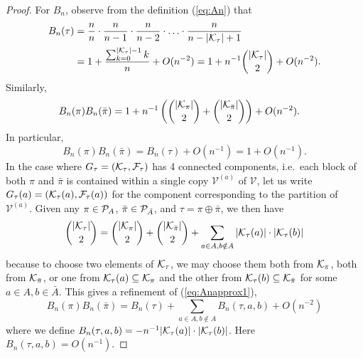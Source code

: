 \documentclass[10pt,reqno]{amsart}
\def\cV{\mathcal{V}}
\begin{document}
\begin{proof}
For $B_n$, observe from the definition (\ref{eq:An}) that
\begin{align*}
B_n(\tau)&=\frac{n}{n} \cdot \frac{n}{n-1} \cdot \frac{n}{n-2}
\cdot \ldots \cdot \frac{n}{n-|\mathcal{K}_\tau|+1}\\
&=1+\frac{\sum_{k=0}^{|\mathcal{K}_\tau|-1} k}{n}+O(n^{-2})
=1+n^{-1}\binom{|\mathcal{K}_\tau|}{2}+O(n^{-2}).
\end{align*}
Similarly,
\begin{align*}
B_n(\pi)B_n(\bar\pi)&=
1+n^{-1}\left(\binom{|\mathcal{K}_\pi|}{2}+\binom{|\mathcal{K}_{\bar\pi}|}{2}\right)+O(n^{-2}).
\end{align*}
In particular,
\begin{equation}\label{eq:Anapprox1}
B_n(\pi)B_n(\bar\pi)=B_n(\tau)+O(n^{-1})=1+O(n^{-1}).
\end{equation}
In the case where $G_\tau=(\mathcal{K}_\tau,\mathcal{F}_\tau)$ has 4 connected components,
i.e.\ each block of both $\pi$ and $\bar\pi$ is contained
within a single copy $\cV^{(a)}$ of $\cV$, let us write $G_\tau(a)=(\mathcal{K}_\tau(a),
\mathcal{F}_\tau(a))$ for the component corresponding to the partition of $\cV^{(a)}$.
Given any $\pi \in \mathcal{P}_A$, $\bar\pi \in \mathcal{P}_{\bar A}$, and
$\tau=\pi \oplus \bar\pi$, we then have
\[\binom{|\mathcal{K}_\tau|}{2}
=\binom{|\mathcal{K}_\pi|}{2}+\binom{|\mathcal{K}_{\bar\pi}|}{2}
+\sum_{a \in A,b \notin A} |\mathcal{K}_\tau(a)| \cdot |\mathcal{K}_\tau(b)|\]
because to choose two elements of $\mathcal{K}_\tau$, we may choose them both from
$\mathcal{K}_\pi$, both from $\mathcal{K}_{\bar\pi}$, or one from $\mathcal{K}_\tau(a) \subseteq \mathcal{K}_\pi$
and the other from $\mathcal{K}_\tau(b) \subseteq \mathcal{K}_{\bar \pi}$ for some $a \in A,b
\in \bar A$. This gives a refinement of (\ref{eq:Anapprox1}),
\begin{equation}\label{eq:Anapprox2}
B_n(\pi)B_n(\bar\pi)=B_n(\tau)+\sum_{a \in A,b \notin A}
B_n(\tau,a,b)+O(n^{-2})
\end{equation}
where we define $B_n(\tau,a,b)=-n^{-1}|\mathcal{K}_\tau(a)| \cdot |\mathcal{K}_\tau(b)|$.
Here $B_n(\tau,a,b)=O(n^{-1})$.


\end{proof}
\end{document}
